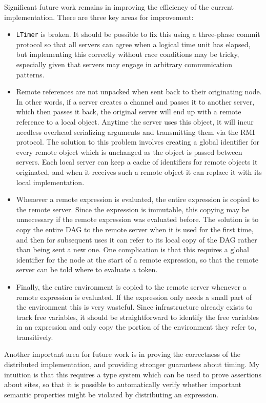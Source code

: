 \documentclass[10pt,letterpaper]{article}
\begin{document}
Significant future work remains in improving the efficiency of the current
implementation. There are three key areas for improvement:
\begin{itemize}
\item \texttt{LTimer} is broken. It should be possible to fix this using a
three-phase commit protocol so that all servers can agree when a logical time
unit has elapsed, but implementing this correctly without race conditions may
be tricky, especially given that servers may engage in arbitrary communication
patterns.
\item Remote references are not unpacked when sent back to their originating
node. In other words, if a server creates a channel and passes it to another
server, which then passes it back, the original server will end up with a
remote reference to a local object. Anytime the server uses this object, it
will incur needless overhead serializing arguments and transmitting them via
the RMI protocol. The solution to this problem involves creating a global
identifier for every remote object which is unchanged as the object is passed
between servers.  Each local server can keep a cache of identifiers for remote
objects it originated, and when it receives such a remote object it can replace
it with its local implementation.
\item Whenever a remote expression is evaluated, the entire expression is
copied to the remote server. Since the expression is immutable, this copying
may be unnecessary if the remote expression was evaluated before. The solution
is to copy the entire DAG to the remote server when it is used for the first
time, and then for subsequent uses it can refer to its local copy of the DAG
rather than being sent a new one. One complication is that this requires a
global identifier for the node at the start of a remote expression, so that the
remote server can be told where to evaluate a token.
\item Finally, the entire environment is copied to the remote server whenever a
remote expression is evaluated. If the expression only needs a small part of
the environment this is very wasteful. Since infrastructure already exists to
track free variables, it should be straightforward to identify the free
variables in an expression and only copy the portion of the environment they
refer to, transitively.
\end{itemize}

Another important area for future work is in proving the correctness of the
distributed implementation, and providing stronger guarantees about timing. My
intuition is that this requires a type system which can be used to prove
assertions about sites, so that it is possible to automatically verify whether
important semantic properties might be violated by distributing an expression.
\end{document}
